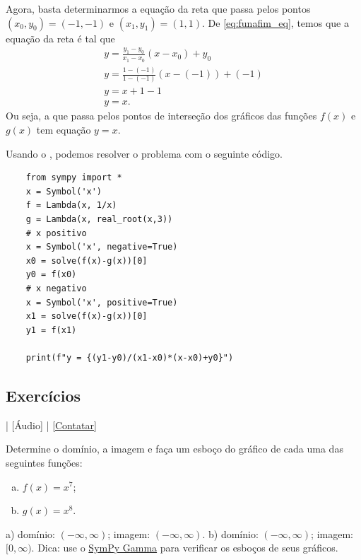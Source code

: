 \begin{resol}
  Agora, basta determinarmos a equação da reta que passa pelos pontos $(x_0, y_0) = (-1, -1)$ e $(x_1, y_1) = (1, 1)$. De \eqref{eq:funafim_eq}, temos que a equação da reta é tal que
  \begin{gather}
    y = \frac{y_1-y_0}{x_1-x_0}(x-x_0)+y_0 \\
    y = \frac{1-(-1)}{1-(-1)}(x-(-1))+(-1)\\
    y = x+1-1\\
    y = x.
  \end{gather}
  Ou seja, a que passa pelos pontos de interseção dos gráficos das funções $f(x)$ e $g(x)$ tem equação $y = x$.

  \ifispython
  Usando o {\sympy}, podemos resolver o problema com o seguinte código. 
  \begin{lstlisting}
    from sympy import *
    x = Symbol('x')
    f = Lambda(x, 1/x)
    g = Lambda(x, real_root(x,3))
    # x positivo
    x = Symbol('x', negative=True)
    x0 = solve(f(x)-g(x))[0]
    y0 = f(x0)
    # x negativo
    x = Symbol('x', positive=True)
    x1 = solve(f(x)-g(x))[0]
    y1 = f(x1)

    print(f"y = {(y1-y0)/(x1-x0)*(x-x0)+y0}")
  \end{lstlisting}
  \fi
\end{resol}

\subsection*{Exercícios}

\begin{flushright}
  [Vídeo] | [Áudio] | \href{https://phkonzen.github.io/notas/contato.html}{[Contatar]}
\end{flushright}

\begin{exer}
  Determine o domínio, a imagem e faça um esboço do gráfico de cada uma das seguintes funções:
  \begin{enumerate}[a)]
  \item $f(x) = x^7$;
  \item $g(x) = x^8$.
  \end{enumerate}
\end{exer}
\begin{resp}
  a) domínio: $(-\infty, \infty)$; imagem: $(-\infty, \infty)$. b) domínio: $(-\infty, \infty)$; imagem: $[0, \infty)$. Dica: use o \href{https://www.sympygamma.com/}{SymPy Gamma} para verificar os esboços de seus gráficos.
\end{resp}

